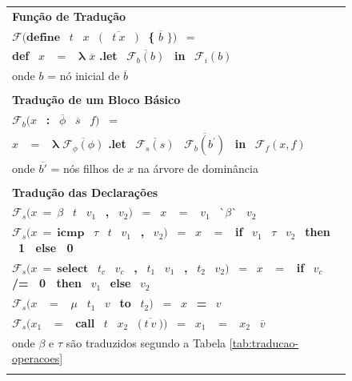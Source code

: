 \begin{figure}[H]
    \begin{tabular}{ l }
    \textbf{Função de Tradução} \\
    $\mathcal{F}(\textbf{define}$ \ $t$ \ $x$ \ $\boldsymbol{(}$ \ $\overline{t \ x}$ \ $\boldsymbol{)}$ \ \textbf{\{} $\overline{b}$ $\textbf{\}})$ \ = \\
    \qquad \textbf{def} \ $x$ \ $\boldsymbol{=}$ \ $\boldsymbol{\lambda}$ $\overline{x}$ \textbf{.let} \ $\overline{\mathcal{F}_b(b)}$ \ \textbf{in} \ $\mathcal{F}_i(b)$ \\
    \qquad onde $b$ = nó inicial de $\overline{b}$ \\ \\
    \textbf{Tradução de um Bloco Básico} \\
    $\mathcal{F}_b(x$ \ \textbf{:} \ $\overline{\phi}$ \ $\overline{s}$ \ $f)$ \ = \\
    \qquad $x$ \ $\boldsymbol{=}$ \ $\boldsymbol{\lambda}$ $\overline{\mathcal{F}_\phi(\phi)}$ \textbf{.let} \ $\overline{\mathcal{F}_s(s)}$ \ $\overline{\mathcal{F}_b(b^\prime)}$ \ \textbf{in} \ $\mathcal{F}_f(x, f)$ \\
    \qquad onde $\overline{b'}$ = nós filhos de $x$ na árvore de dominância \\ \\
    \textbf{Tradução das Declarações} \\
    $\mathcal{F}_s(x \ \boldsymbol{=} \ \beta$ \ $t$ \ $v_1$ \ \textbf{,} \ $v_2)$ \ = \ $x$ \ $\boldsymbol{=}$ \ $v_1$ \ \`{}$\beta$\`{} \  $v_2$ \\
    $\mathcal{F}_s(x \ \boldsymbol{=} \ \mathbf{icmp}$ \ $\tau$ \ $t$ \ $v_1$ \ \textbf{,} \ $v_2)$ \ = \ $x$ \ $\boldsymbol{=}$ \ \textbf{if} \ $v_1$ \ $\tau$ \ $v_2$ \ \textbf{then \ 1 \ else \ 0} \\
    $\mathcal{F}_s(x \ \boldsymbol{=} \ \textbf{select}$ \ $t_c$ \ $v_c$ \ \textbf{,} \ $t_1$ \ $v_1$ \ \textbf{,} \ $t_2$ \ $v_2)$ \ = \ $x$ \ $\boldsymbol{=}$ \ \textbf{if} \ $v_c$ \textbf{/= \ 0 \ then} \ $v_1$ \ \textbf{else} \ $v_2$ \\
    $\mathcal{F}_s(x$ \ $\boldsymbol{=}$ \ $\mu$ \ $t_1$ \ $v$ \ \textbf{to} \ $t_2)$ \ = \ $x$ \ \textbf{=} \ $v$ \\
    $\mathcal{F}_s(x_1$ \ $\boldsymbol{=}$ \ \textbf{call} \ $t$ \ $x_2$ \ $\textbf{(} \ \overline{t \ v} \ \textbf{)})$ \ = \ $x_1$ \ $\boldsymbol{=}$ \ $x_2$ \ $\overline{v}$ \\
    onde $\beta$ e $\tau$ são traduzidos segundo a Tabela \ref{tab:traducao-operacoes} \\ \\

\end{tabular}
\end{figure}

